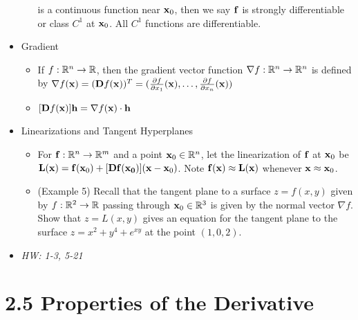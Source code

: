 \documentclass[11pt]{article}
\begin{document}
\begin{itemize}
\begin{itemize}
        is a continuous function near \(\mathbf{x}_0\), then we say \(\mathbf{f}\)
        is strongly differentiable or class \(C^1\) at \(\mathbf{x}_0\).
        All \(C^1\) functions are differentiable.
    \end{itemize}
  \item Gradient
    \begin{itemize}
      \item If \(f:\mathbb R^n\to\mathbb R\), then the gradient vector function
        \(\nabla f:\mathbb R^n\to\mathbb R^n\) is defined by
        \(
          \nabla f(\mathbf{x})
            =
          (\mathbf{D} f(\mathbf{x}))^T
            =
          (\frac{\partial f}{\partial x_1}(\mathbf{x}),\dots,\frac{\partial f}{\partial x_n}(\mathbf{x}))
        \)
      \item
        \(
          [\mathbf{D} f(\mathbf{x})]\mathbf{h}
            =
          \nabla f(\mathbf{x}) \cdot \mathbf{h}
        \)
    \end{itemize}
  \item Linearizations and Tangent Hyperplanes
    \begin{itemize}
      \item For \(\mathbf{f}:\mathbb R^n\to\mathbb R^m\) and a point \(\mathbf{x}_0\in\mathbb R^n\),
        let the linearization of \(\mathbf{f}\) at \(\mathbf{x}_0\) be
          \(
            \mathbf{L}(\mathbf{x})
              =
            \mathbf{f}(\mathbf{x}_0)+[\mathbf{D}\mathbf{f}(\mathbf{x_0})](\mathbf{x}-\mathbf{x}_0)
          \).
        Note \(\mathbf{f}(\mathbf{x})\approx\mathbf{L}(\mathbf{x})\) whenever
        \(\mathbf{x}\approx\mathbf{x}_0\).
      \item (Example 5) Recall that the tangent plane to a surface \(z=f(x,y)\)
        given by \(f:\mathbb R^2\to\mathbb R\) passing through \(\mathbf{x}_0\in\mathbb R^3\)
        is given by the normal vector \(\nabla f\).
        Show that \(z=L(x,y)\) gives an equation for the tangent plane to the
        surface \(z=x^2+y^4+e^{xy}\) at the point \((1,0,2)\).
    \end{itemize}
  \item\textit{
    HW: 1-3, 5-21
  }
\end{itemize}


\section*{2.5 Properties of the Derivative}
\end{document}

